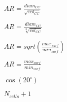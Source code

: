 \documentclass{article}
\begin{document}
$ AR = \frac{diam_{CC}}{\sqrt{vol_{CC}}} $
\pagebreak

$ AR = \frac{diam_{CC}}{\sqrt[3]{vol_{CC}}} $
\pagebreak

$ AR = sqrt(\frac{max_{surf}}{min_{surf}}) $
\pagebreak

$ AR = \frac{max_{surf}}{min_{surf}} $
\pagebreak

$ \cos(20^\circ) $
\pagebreak

$ N_{cells} + 1 $
\pagebreak
\end{document}
